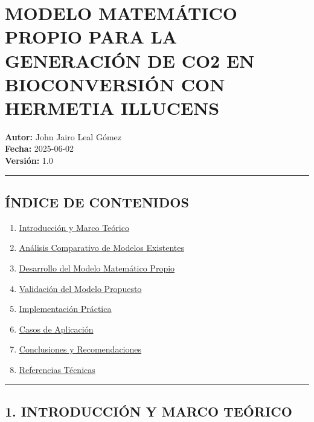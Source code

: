 \documentclass[
]{article}
\author{}
\date{}
\providecommand{\tightlist}{%
  \setlength{\itemsep}{0pt}\setlength{\parskip}{0pt}}
\begin{document}
\section{MODELO MATEMÁTICO PROPIO PARA LA GENERACIÓN DE CO2 EN
BIOCONVERSIÓN CON HERMETIA
ILLUCENS}\label{modelo-matemuxe1tico-propio-para-la-generaciuxf3n-de-co2-en-bioconversiuxf3n-con-hermetia-illucens}

\textbf{Autor:} John Jairo Leal Gómez\\
\textbf{Fecha:} 2025-06-02\\
\textbf{Versión:} 1.0

\begin{center}\rule{0.5\linewidth}{0.5pt}\end{center}

\subsection{ÍNDICE DE CONTENIDOS}\label{uxedndice-de-contenidos}

\begin{enumerate}
\def\labelenumi{\arabic{enumi}.}
\tightlist
\item
  \hyperref[1-introducciuxf3n-y-marco-teuxf3rico]{Introducción y Marco
  Teórico}
\item
  \hyperref[2-anuxe1lisis-comparativo-de-modelos-existentes]{Análisis
  Comparativo de Modelos Existentes}
\item
  \hyperref[3-desarrollo-del-modelo-matemuxe1tico-propio]{Desarrollo del
  Modelo Matemático Propio}
\item
  \hyperref[4-validaciuxf3n-del-modelo-propuesto]{Validación del Modelo
  Propuesto}
\item
  \hyperref[5-implementaciuxf3n-pruxe1ctica]{Implementación Práctica}
\item
  \hyperref[6-casos-de-aplicaciuxf3n]{Casos de Aplicación}
\item
  \hyperref[7-conclusiones-y-recomendaciones]{Conclusiones y
  Recomendaciones}
\item
  \hyperref[8-referencias-tuxe9cnicas]{Referencias Técnicas}
\end{enumerate}

\begin{center}\rule{0.5\linewidth}{0.5pt}\end{center}

\subsection{1. INTRODUCCIÓN Y MARCO
TEÓRICO}\label{introducciuxf3n-y-marco-teuxf3rico}
\end{document}
